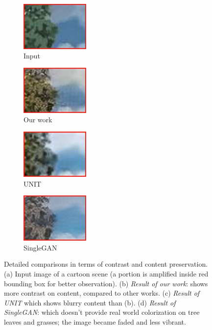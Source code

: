 \documentclass[conference]{IEEEtran}
\begin{document}
\begin{figure}[!htb]
\begin{center}
\begin{subfigure}[normal]{0.2\textwidth}
     \end{subfigure}
     \\
     \begin{subfigure}[normal]{0.2\textwidth}
         \includegraphics[scale = 0.7]{zooming_picture/in_y.jpg}
         \caption{Input}
     \end{subfigure}
     \hspace{0.0001mm}
     \begin{subfigure}[normal]{0.2\textwidth}
         \includegraphics[scale = 0.7]{zooming_picture/our_y.jpg}
         \caption{Our work}
     \end{subfigure}
     \hspace{0.0001mm}
     \begin{subfigure}[normal]{0.2\textwidth}
         \includegraphics[scale = 0.7]{zooming_picture/unit_y.jpg}
         \caption{UNIT}
    \end{subfigure}
     \hspace{0.0001mm}
     \begin{subfigure}[normal]{0.2\textwidth}
         \includegraphics[scale = 0.7]{zooming_picture/sgan_y.jpg}
         \caption{SingleGAN}
     \end{subfigure}
     \caption{Detailed comparisons in terms of contrast and content preservation. (a) Input image of a cartoon scene (a portion is amplified inside red bounding box for better observation). (b) \textit{Result of our work}: shows more contrast on content, compared to other works. (c) \textit{Result of UNIT}\cite{DBLP:journals/corr/LiuBK17} which shows blurry content than (b). (d) \textit{Result of SingleGAN}: which doesn't provide real world colorization on tree leaves and grasses; the image became faded and less vibrant.} 
     \label{fig:compare}
\end{center}
\end{figure}
\end{document}
